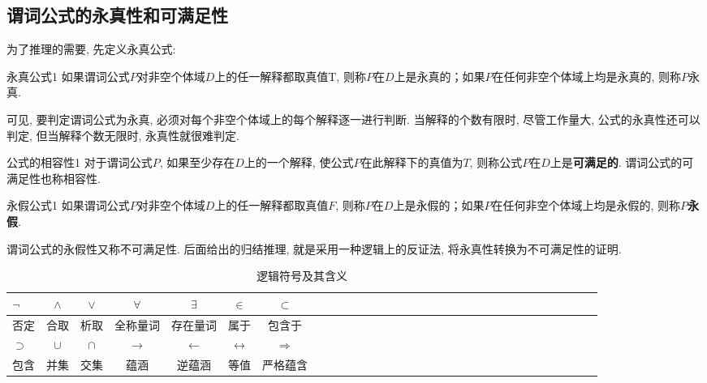 \subsection{谓词公式的永真性和可满足性}
 为了推理的需要, 先定义永真公式:
\begin{mydef}{永真公式}{1}
如果谓词公式$P$对非空个体域$D$上的任一解释都取真值T, 则称$P$在$D$上是永真的；如果$P$在任何非空个体域上均是永真的, 则称$P$永真.
\end{mydef}

可见, 要判定谓词公式为永真, 必须对每个非空个体域上的每个解释逐一进行判断. 当解释的个数有限时, 尽管工作量大, 公式的永真性还可以判定, 但当解释个数无限时, 永真性就很难判定.
\begin{mydef}{公式的相容性}{1}
对于谓词公式$P$, 如果至少存在$D$上的一个解释, 使公式$P$在此解释下的真值为$T$, 则称公式$P$在$D$上是\textbf{可满足的}.
谓词公式的可满足性也称相容性.
\end{mydef}
\begin{mydef}{永假公式}{1}
如果谓词公式$P$对非空个体域$D$上的任一解释都取真值$F$, 则称$P$在$D$上是永假的；如果$P$在任何非空个体域上均是永假的, 则称\textbf{$P$永假}.
\end{mydef}
\begin{remark}
  谓词公式的永假性又称不可满足性. 后面给出的归结推理, 就是采用一种逻辑上的反证法, 将永真性转换为不可满足性的证明.
\end{remark}
\begin{table}[H]
\caption{逻辑符号及其含义}
\vspace{-0.3cm}
\begin{center}
\begin{tabular} {lccccccccccccccccccccccccccccccc}
\hline
$\neg$&$\wedge$&$\vee$&$\forall$&$\exists$&$\in$&$\subset$\\
\hline
否定	&合取&析取&全称量词&存在量词&属于&包含于\\
\hline
$\supset$&$\cup$&$\cap$&$\rightarrow$&$\leftarrow$&$\leftrightarrow$&$\Rightarrow$\\
\hline
包含&并集&交集&蕴涵&逆蕴涵&等值&严格蕴含\\
\hline
\end{tabular}
\end{center}
\label{AItable202020020101}
\end{table}
